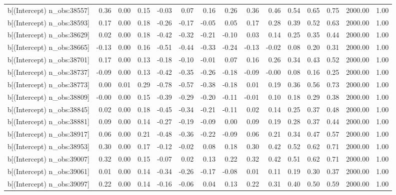 \begin{table}[ht]
\begin{tabular}{rrrrrrrrrrrrrrr}
  b[(Intercept) n\_obs:38557] & 0.36 & 0.00 & 0.15 & -0.03 & 0.07 & 0.16 & 0.26 & 0.36 & 0.46 & 0.54 & 0.65 & 0.75 & 2000.00 & 1.00 \\ 
  b[(Intercept) n\_obs:38593] & 0.17 & 0.00 & 0.18 & -0.26 & -0.17 & -0.05 & 0.05 & 0.17 & 0.28 & 0.39 & 0.52 & 0.63 & 2000.00 & 1.00 \\ 
  b[(Intercept) n\_obs:38629] & 0.02 & 0.00 & 0.18 & -0.42 & -0.32 & -0.21 & -0.10 & 0.03 & 0.14 & 0.25 & 0.35 & 0.44 & 2000.00 & 1.00 \\ 
  b[(Intercept) n\_obs:38665] & -0.13 & 0.00 & 0.16 & -0.51 & -0.44 & -0.33 & -0.24 & -0.13 & -0.02 & 0.08 & 0.20 & 0.31 & 2000.00 & 1.00 \\ 
  b[(Intercept) n\_obs:38701] & 0.17 & 0.00 & 0.13 & -0.18 & -0.10 & -0.01 & 0.07 & 0.16 & 0.26 & 0.34 & 0.43 & 0.52 & 2000.00 & 1.00 \\ 
  b[(Intercept) n\_obs:38737] & -0.09 & 0.00 & 0.13 & -0.42 & -0.35 & -0.26 & -0.18 & -0.09 & -0.00 & 0.08 & 0.16 & 0.25 & 2000.00 & 1.00 \\ 
  b[(Intercept) n\_obs:38773] & 0.00 & 0.01 & 0.29 & -0.78 & -0.57 & -0.38 & -0.18 & 0.01 & 0.19 & 0.36 & 0.56 & 0.73 & 2000.00 & 1.00 \\ 
  b[(Intercept) n\_obs:38809] & -0.00 & 0.00 & 0.15 & -0.39 & -0.29 & -0.20 & -0.11 & -0.01 & 0.10 & 0.18 & 0.29 & 0.38 & 2000.00 & 1.00 \\ 
  b[(Intercept) n\_obs:38845] & 0.02 & 0.00 & 0.18 & -0.45 & -0.34 & -0.21 & -0.11 & 0.02 & 0.14 & 0.25 & 0.37 & 0.48 & 2000.00 & 1.00 \\ 
  b[(Intercept) n\_obs:38881] & 0.09 & 0.00 & 0.14 & -0.27 & -0.19 & -0.09 & 0.00 & 0.09 & 0.19 & 0.28 & 0.37 & 0.44 & 2000.00 & 1.00 \\ 
  b[(Intercept) n\_obs:38917] & 0.06 & 0.00 & 0.21 & -0.48 & -0.36 & -0.22 & -0.09 & 0.06 & 0.21 & 0.34 & 0.47 & 0.57 & 2000.00 & 1.00 \\ 
  b[(Intercept) n\_obs:38953] & 0.30 & 0.00 & 0.17 & -0.12 & -0.02 & 0.08 & 0.18 & 0.30 & 0.42 & 0.52 & 0.62 & 0.71 & 2000.00 & 1.00 \\ 
  b[(Intercept) n\_obs:39007] & 0.32 & 0.00 & 0.15 & -0.07 & 0.02 & 0.13 & 0.22 & 0.32 & 0.42 & 0.51 & 0.62 & 0.71 & 2000.00 & 1.00 \\ 
  b[(Intercept) n\_obs:39061] & 0.01 & 0.00 & 0.14 & -0.34 & -0.26 & -0.17 & -0.08 & 0.01 & 0.11 & 0.19 & 0.30 & 0.37 & 2000.00 & 1.00 \\ 
  b[(Intercept) n\_obs:39097] & 0.22 & 0.00 & 0.14 & -0.16 & -0.06 & 0.04 & 0.13 & 0.22 & 0.31 & 0.40 & 0.50 & 0.59 & 2000.00 & 1.00 \\ 

\end{tabular}
\end{table}
